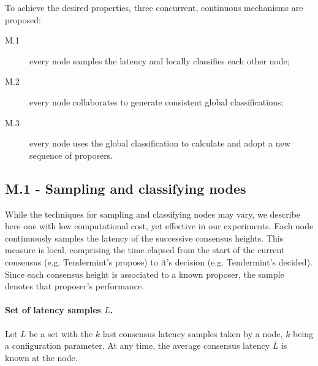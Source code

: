 
To achieve the desired properties, three concurrent, continuous mechanisms are proposed:
\begin{description} 
    \item[M.1] every node samples the latency and locally classifies each other node;
    
    \item[M.2] every node collaborates to generate consistent global classifications;
    
    \item[M.3] every node uses the global classification to calculate and adopt a new sequence of proposers.   
\end{description}

\subsection{M.1 - Sampling and classifying nodes}

While the techniques for sampling and classifying nodes may vary, we describe here one with low computational cost, yet effective in our experiments. 
%
Each node continuously samples the latency of the successive consensus heights.  This measure is local, comprising the time elapsed from the start of the current consensus (e.g. Tendermint's propose) to it's decision (e.g. Tendermint's decided).   Since each consensus height is associated to a known proposer, the sample denotes that proposer's performance.  

\paragraph{Set of latency samples $L$.} Let $L$ be a set with the $k$ last consensus latency samples taken by a node, $k$ being a configuration parameter.  At any time, the average consensus latency $\bar{L}$ is known at the node.

